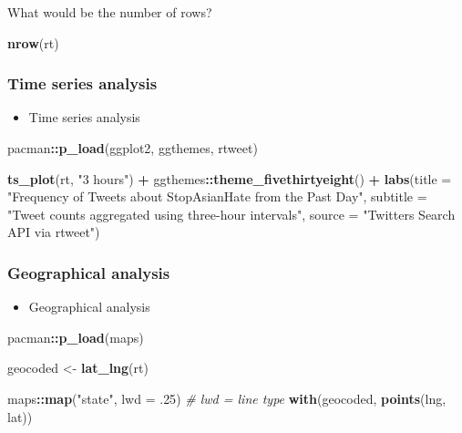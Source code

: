 \documentclass[
]{book}
\newenvironment{Shaded}{\begin{snugshade}}{\end{snugshade}}
\newcommand{\AttributeTok}[1]{\textcolor[rgb]{0.13,0.29,0.53}{#1}}
\newcommand{\CommentTok}[1]{\textcolor[rgb]{0.56,0.35,0.01}{\textit{#1}}}
\newcommand{\DecValTok}[1]{\textcolor[rgb]{0.00,0.00,0.81}{#1}}
\newcommand{\FunctionTok}[1]{\textcolor[rgb]{0.13,0.29,0.53}{\textbf{#1}}}
\newcommand{\NormalTok}[1]{#1}
\newcommand{\OtherTok}[1]{\textcolor[rgb]{0.56,0.35,0.01}{#1}}
\newcommand{\SpecialCharTok}[1]{\textcolor[rgb]{0.81,0.36,0.00}{\textbf{#1}}}
\newcommand{\StringTok}[1]{\textcolor[rgb]{0.31,0.60,0.02}{#1}}
\providecommand{\tightlist}{%
  \setlength{\itemsep}{0pt}\setlength{\parskip}{0pt}}
\begin{document}
What would be the number of rows?

\begin{Shaded}
\begin{Highlighting}[]
\FunctionTok{nrow}\NormalTok{(rt)}
\end{Highlighting}
\end{Shaded}

\subsubsection{Time series analysis}\label{time-series-analysis}

\begin{itemize}
\tightlist
\item
  Time series analysis
\end{itemize}

\begin{Shaded}
\begin{Highlighting}[]
\NormalTok{pacman}\SpecialCharTok{::}\FunctionTok{p\_load}\NormalTok{(ggplot2, ggthemes, rtweet)}

\FunctionTok{ts\_plot}\NormalTok{(rt, }\StringTok{"3 hours"}\NormalTok{) }\SpecialCharTok{+}
\NormalTok{  ggthemes}\SpecialCharTok{::}\FunctionTok{theme\_fivethirtyeight}\NormalTok{() }\SpecialCharTok{+}
  \FunctionTok{labs}\NormalTok{(}\AttributeTok{title =} \StringTok{"Frequency of Tweets about StopAsianHate from the Past Day"}\NormalTok{,}
       \AttributeTok{subtitle =} \StringTok{"Tweet counts aggregated using three{-}hour intervals"}\NormalTok{,}
       \AttributeTok{source =} \StringTok{"Twitter\textquotesingle{}s Search API via rtweet"}\NormalTok{)}
\end{Highlighting}
\end{Shaded}

\subsubsection{Geographical analysis}\label{geographical-analysis}

\begin{itemize}
\tightlist
\item
  Geographical analysis
\end{itemize}

\begin{Shaded}
\begin{Highlighting}[]
\NormalTok{pacman}\SpecialCharTok{::}\FunctionTok{p\_load}\NormalTok{(maps)}

\NormalTok{geocoded }\OtherTok{\textless{}{-}} \FunctionTok{lat\_lng}\NormalTok{(rt)}

\NormalTok{maps}\SpecialCharTok{::}\FunctionTok{map}\NormalTok{(}\StringTok{"state"}\NormalTok{, }\AttributeTok{lwd =}\NormalTok{ .}\DecValTok{25}\NormalTok{) }\CommentTok{\# lwd = line type }
\FunctionTok{with}\NormalTok{(geocoded, }\FunctionTok{points}\NormalTok{(lng, lat))}
\end{Highlighting}
\end{Shaded}
\end{document}
